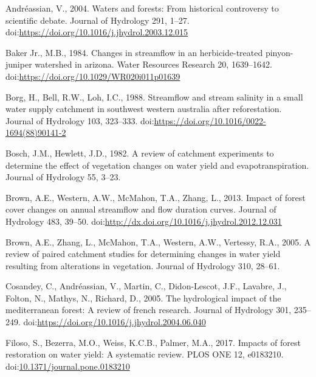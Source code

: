 \documentclass[]{elsarticle} %
\newlength{\cslhangindent}
\newlength{\cslentryspacingunit} %
\newenvironment{CSLReferences}[2] %
 {%
  \setlength{\parindent}{0pt}
  \ifodd #1
  \let\oldpar\par
  \def\par{\hangindent=\cslhangindent\oldpar}
  \fi
  \setlength{\parskip}{#2\cslentryspacingunit}
 }%
 {}
\begin{document}
\hypertarget{refs}{}
\begin{CSLReferences}{1}{0}
\leavevmode{}%
Andréassian, V., 2004. Waters and forests: From historical controversy to scientific debate. Journal of Hydrology 291, 1--27. doi:\url{https://doi.org/10.1016/j.jhydrol.2003.12.015}

\leavevmode{}%
Baker Jr., M.B., 1984. Changes in streamflow in an herbicide-treated pinyon-juniper watershed in arizona. Water Resources Research 20, 1639--1642. doi:\url{https://doi.org/10.1029/WR020i011p01639}

\leavevmode{}%
Borg, H., Bell, R.W., Loh, I.C., 1988. Streamflow and stream salinity in a small water supply catchment in southwest western australia after reforestation. Journal of Hydrology 103, 323--333. doi:\url{https://doi.org/10.1016/0022-1694(88)90141-2}

\leavevmode{}%
Bosch, J.M., Hewlett, J.D., 1982. A review of catchment experiments to determine the effect of vegetation changes on water yield and evapotranspiration. Journal of Hydrology 55, 3--23.

\leavevmode{}%
Brown, A.E., Western, A.W., McMahon, T.A., Zhang, L., 2013. Impact of forest cover changes on annual streamflow and flow duration curves. Journal of Hydrology 483, 39--50. doi:\url{http://dx.doi.org/10.1016/j.jhydrol.2012.12.031}

\leavevmode{}%
Brown, A.E., Zhang, L., McMahon, T.A., Western, A.W., Vertessy, R.A., 2005. A review of paired catchment studies for determining changes in water yield resulting from alterations in vegetation. Journal of Hydrology 310, 28--61.

\leavevmode{}%
Cosandey, C., Andréassian, V., Martin, C., Didon-Lescot, J.F., Lavabre, J., Folton, N., Mathys, N., Richard, D., 2005. The hydrological impact of the mediterranean forest: A review of french research. Journal of Hydrology 301, 235--249. doi:\url{https://doi.org/10.1016/j.jhydrol.2004.06.040}

\leavevmode{}%
Filoso, S., Bezerra, M.O., Weiss, K.C.B., Palmer, M.A., 2017. Impacts of forest restoration on water yield: A systematic review. PLOS ONE 12, e0183210. doi:\href{https://doi.org/10.1371/journal.pone.0183210}{10.1371/journal.pone.0183210}


\end{CSLReferences}
\end{document}
